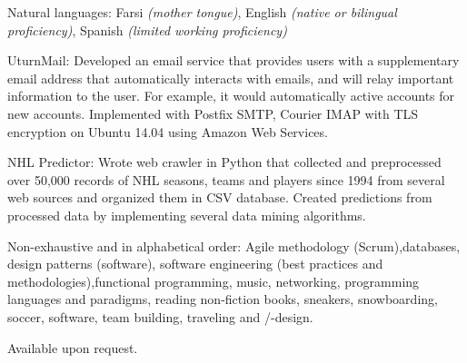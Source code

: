 \documentclass[10pt,a4paper]{article}
\begin{document}
\vspace{0.5em}
\inlineheadsection
  {Natural languages:}
  {Farsi \emph{(mother tongue)}, English \emph{(native or bilingual proficiency)},
Spanish \emph{(limited working proficiency)}}

\spacedhrule{1.6em}{-0.4em}

\inlineheadsection
  {UturnMail:}
  {Developed an email service that provides users with a supplementary
email address that automatically interacts with emails, and will relay important information to the user. For example, it would automatically active accounts for new accounts.
Implemented with Postfix SMTP, Courier IMAP with TLS encryption on Ubuntu 14.04 using Amazon Web Services.}

\vspace{0.5em}
\inlineheadsection
  {NHL Predictor:}
  {Wrote web crawler in Python that collected and preprocessed over
50,000 records of NHL seasons, teams and players since 1994 from several web sources and organized them
in CSV database. Created predictions from processed data by implementing several data mining algorithms.}

\spacedhrule{1.6em}{-0.4em}


\inlineheadsection
  {Non-exhaustive and in alphabetical order:}
  {Agile methodology (Scrum),databases, design patterns (software), software engineering (best practices and methodologies),functional programming, music, networking, programming languages and paradigms, reading non-fiction books, sneakers, snowboarding, soccer, software, team building, traveling and /-design.}

\spacedhrule{1.6em}{-0.4em}



\inlineheadsection
  {Available upon request.}
\end{document}
